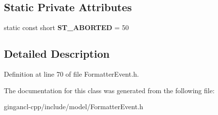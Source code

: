 \subsection*{Static Private Attributes}
\begin{CompactItemize}
\item 
static const short {\bf ST\_\-ABORTED} = 50\label{classbr_1_1pucrio_1_1telemidia_1_1ginga_1_1ncl_1_1model_1_1event_1_1FormatterEvent_de3b553f86b215ea7e289d9309d4b2f2}

\end{CompactItemize}


\subsection{Detailed Description}




Definition at line 70 of file FormatterEvent.h.

The documentation for this class was generated from the following file:\begin{CompactItemize}
\item 
gingancl-cpp/include/model/FormatterEvent.h\end{CompactItemize}

